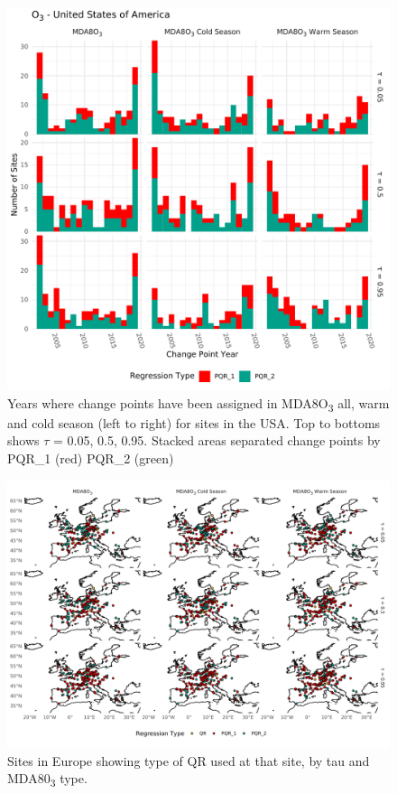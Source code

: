 \documentclass{article}
\begin{document}
\begin{figure}[p]
\centering
\includegraphics[width=\linewidth]{figures/si_figures/fS02_cp_year_o3_United-States-of-America.pdf}
\caption{Years where change points have been assigned in MDA8O\textsubscript{3} all, warm and cold season (left to right) for sites in the USA. Top to bottoms shows $\tau$ = 0.05, 0.5, 0.95. Stacked areas separated change points by PQR\_1 (red) PQR\_2 (green)}
\label{si_fig:cp_year_usa}
\end{figure}
\clearpage

\begin{figure}
\centering
\includegraphics[width=\linewidth]{figures/si_figures/fS03_regression_type_map_eu.pdf}
\caption{Sites in Europe showing type of QR used at that site, by tau and MDA80\textsubscript{3} type.}
\label{si_fig:reg_map_eu}
\end{figure}
\clearpage
\end{document}
